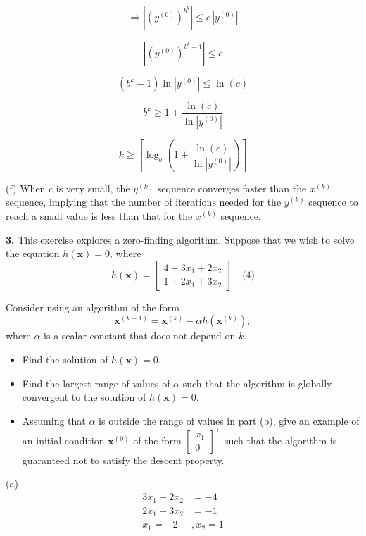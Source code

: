 \documentclass[12pt]{article}
\begin{document}
\[
\Rightarrow \left| (y^{(0)})^{b^k} \right| \leq c \, |y^{(0)}|
\]

\[
\left| (y^{(0)})^{b^k - 1} \right| \leq c
\]

\[
(b^k - 1) \ln |y^{(0)}| \leq \ln(c)
\]

\[
b^k \geq 1 + \frac{\ln(c)}{\ln |y^{(0)}|}
\]

\[
k \geq \left\lceil \log_b \left( 1 + \frac{\ln(c)}{\ln |y^{(0)}|} \right) \right\rceil
\]

(f) When \( c \) is very small, the \( y^{(k)} \) sequence converges faster than the \( x^{(k)} \) sequence, implying that the number of iterations needed for the \( y^{(k)} \) sequence to reach a small value is less than that for the \( x^{(k)} \) sequence.

\begin{mybluebox}
  \textbf{3.} This exercise explores a zero-finding algorithm. Suppose that we wish to solve the equation \( h(\mathbf{x}) = 0 \), where
\[
h(\mathbf{x}) = \begin{bmatrix}
4 + 3x_1 + 2x_2 \\
1 + 2x_1 + 3x_2
\end{bmatrix} \quad \text{(4)}
\]

Consider using an algorithm of the form 
\[
\mathbf{x}^{(k+1)} = \mathbf{x}^{(k)} - \alpha h(\mathbf{x}^{(k)}),
\]
where \( \alpha \) is a scalar constant that does not depend on \( k \).

\begin{itemize}
    \item[(a)] Find the solution of \( h(\mathbf{x}) = 0 \).
    \item[(b)] Find the largest range of values of \( \alpha \) such that the algorithm is globally convergent to the solution of \( h(\mathbf{x}) = 0 \).
    \item[(c)] Assuming that \( \alpha \) is outside the range of values in part (b), give an example of an initial condition \( \mathbf{x}^{(0)} \) of the form \( \begin{bmatrix} x_1 \\ 0 \end{bmatrix}^\top \) such that the algorithm is guaranteed not to satisfy the descent property.
\end{itemize}
\end{mybluebox}
(a) 
\begin{align}
  3x_1 + 2x_2 &= -4\\
  2x_1 + 3x_2 &= -1\\
  x_1 = -2&, x_2 = 1
\end{align}
\end{document}
